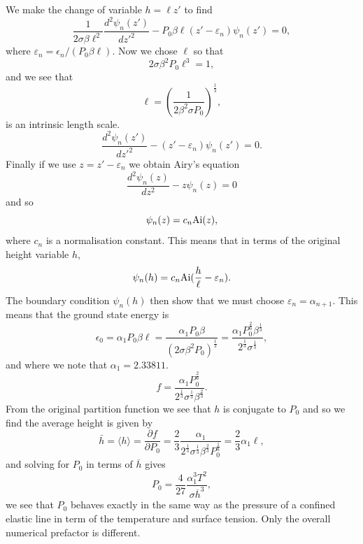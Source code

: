 We make the change of variable $h=\ell z'$ to find
\begin{equation}
\frac{1}{2\sigma\beta\ell^2}\frac{d^2 \psi_n(z')}{dz'^2}- P_0\beta \ell(z'-\varepsilon_n)\psi_n(z')=0,
\end{equation}
where $\varepsilon_n= \epsilon_n/(P_0\beta\ell)$. Now  we chose $\ell$ so that
\begin{equation}
2\sigma\beta^2P_0 \ell^3=1,
\end{equation}
and we see that  
\begin{equation}
\ell = \left(\frac{1}{2\beta^2\sigma P_0}\right)^{\frac{1}{3}},
\end{equation}
is an intrinsic length scale.
\begin{equation}
\frac{d^2 \psi_n(z')}{dz'^2}- (z'-\varepsilon_n)\psi_n(z')=0.
\end{equation}
Finally if we use $z=z'-\varepsilon_n$ we obtain Airy's equation
\begin{equation}
\frac{d^2 \psi_n(z)}{dz^2}- z\psi_n(z)=0
\end{equation}
and so
\begin{equation}
\psi_n(z)= c_n {\rm Ai}(z),
\end{equation}
where $c_n$ is a normalisation constant. This means that in terms of the original height variable $h$, 
\begin{equation}
\psi_n(h)= c_n {\rm Ai}(\frac{h}{\ell}-\varepsilon_n).
\end{equation}
The boundary condition $\psi_n(h)$ then show that we must choose $\varepsilon_n=\alpha_{n+1}$. This means that the ground state energy is
\begin{equation}
\epsilon_0 = \alpha_1P_0\beta\ell= \frac{\alpha_1P_0\beta}{(2\sigma\beta^2P_0)^\frac{1}{3}}= \frac{\alpha_1 P_0^\frac{2}{3}\beta^\frac{1}{3}}{2^\frac{1}{3} \sigma^\frac{1}{3}},
\end{equation}
and where we note that $\alpha_1 = 2.33811$.
\begin{equation}
f= \frac{\alpha_1 P_0^\frac{2}{3}}{2^\frac{1}{3} \sigma^\frac{1}{3}\beta^\frac{2}{3}}.
\end{equation}
From the original partition function we see that $h$ is conjugate to $P_0$ and so we find the average height is given by
\begin{equation}
\bar h= \langle h\rangle = \frac{\partial f}{\partial P_0} = \frac{2}{3}\frac{\alpha_1 }{2^\frac{1}{3} \sigma^\frac{1}{3}\beta^\frac{2}{3}P_0^\frac{1}{3}} = \frac{2}{3}\alpha_1\ell,\label{h1}
\end{equation}
and solving for $P_0$ in terms of $\overline h$ gives
\begin{equation}
P_0 = \frac{4}{27}\frac{\alpha_1^3 T^2}{\sigma \overline h^3},
\end{equation}
we see that $P_0$ behaves exactly in the same way as the pressure of a confined elastic line
in term of the temperature and surface tension. Only the overall numerical prefactor is different.

